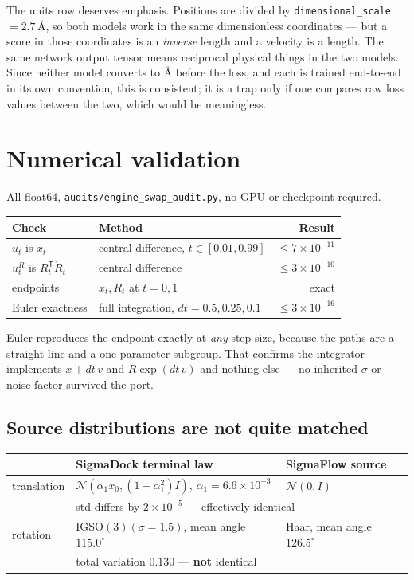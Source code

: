 \documentclass[11pt,a4paper]{report}
\theoremstyle{definition}
\theoremstyle{remark}
\newcommand{\file}[1]{\texttt{#1}}
\begin{document}
The units row deserves emphasis. Positions are divided by
\texttt{dimensional\_scale} $=2.7$\,\AA, so both models work in the same
dimensionless coordinates --- but a score in those coordinates is an
\emph{inverse} length and a velocity is a length. The same network output
tensor means reciprocal physical things in the two models. Since neither
model converts to \AA{} before the loss, and each is trained end-to-end in
its own convention, this is consistent; it is a trap only if one compares raw
loss values between the two, which would be meaningless.

\section{Numerical validation}
\label{sec:engine-numerics}

All float64, \file{audits/engine\_swap\_audit.py}, no GPU or checkpoint
required.

\begin{center}
\begin{tabular}{llr}
\toprule
Check & Method & Result \\
\midrule
$u_t$ is $\dot x_t$ & central difference, $t\in[0.01,0.99]$ & $\le7\times10^{-11}$ \\
$u^R_t$ is $R_t^{\mathsf T}\dot R_t$ & central difference & $\le3\times10^{-10}$ \\
endpoints & $x_t,R_t$ at $t=0,1$ & exact \\
Euler exactness & full integration, $dt=0.5,0.25,0.1$ & $\le3\times10^{-16}$ \\
\bottomrule
\end{tabular}
\end{center}

Euler reproduces the endpoint exactly at \emph{any} step size, because the
paths are a straight line and a one-parameter subgroup. That confirms the
integrator implements $x+dt\,v$ and $R\exp(dt\,v)$ and nothing else --- no
inherited $\sigma$ or noise factor survived the port.

\subsection{Source distributions are not quite matched}
\label{sec:engine-sources}

\begin{center}
\begin{tabular}{lll}
\toprule
 & SigmaDock terminal law & SigmaFlow source \\
\midrule
translation & $\mathcal N(\alpha_1x_0,(1-\alpha_1^2)I)$, $\alpha_1=6.6\times10^{-3}$ & $\mathcal N(0,I)$ \\
 & \multicolumn{2}{l}{std differs by $2\times10^{-5}$ --- effectively identical} \\
\midrule
rotation & $\mathrm{IGSO}(3)(\sigma{=}1.5)$, mean angle $115.0^\circ$ & Haar, mean angle $126.5^\circ$ \\
 & \multicolumn{2}{l}{total variation $0.130$ --- \textbf{not} identical} \\
\bottomrule
\end{tabular}
\end{center}
\end{document}
